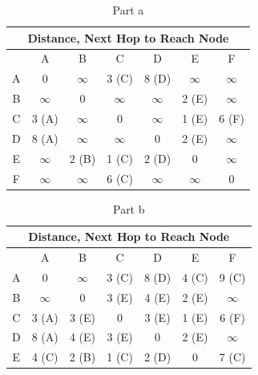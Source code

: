 \documentclass[12pt,addpoints,answers]{exam}
\begin{document}
\begin{questions}
\begin{table}[]
	\centering
	\caption{Part a}
	\label{Solution 7}
	\begin{tabular}{|c|c|c|c|c|c|c|}
		\hline
		\multicolumn{7}{|c|}{Distance, Next Hop to Reach Node}              \\ \hline
		& A        & B        & C        & D        & E        & F        \\ \hline
		A & 0        & $\infty$ & 3 (C)    & 8 (D)    & $\infty$ & $\infty$ \\
		B & $\infty$ & 0        & $\infty$ & $\infty$ & 2 (E)    & $\infty$ \\
		C & 3 (A)    & $\infty$ & 0        & $\infty$ & 1 (E)    & 6 (F)    \\
		D & 8 (A)    & $\infty$ & $\infty$ & 0        & 2 (E)    & $\infty$ \\
		E & $\infty$ & 2 (B)    & 1 (C)    & 2 (D)    & 0        & $\infty$ \\
		F & $\infty$ & $\infty$ & 6 (C)    & $\infty$ & $\infty$ & 0       
	\end{tabular}
\end{table}
\begin{table}[]
	\centering
	\caption{Part b}
	\label{Solution 7}
	\begin{tabular}{|c|c|c|c|c|c|c|}
		\hline
		\multicolumn{7}{|c|}{Distance, Next Hop to Reach Node}        \\ \hline
		& A        & B        & C     & D        & E     & F        \\ \hline
		A & 0        & $\infty$ & 3 (C) & 8 (D)    & 4 (C) & 9 (C)    \\
		B & $\infty$ & 0        & 3 (E) & 4 (E)    & 2 (E) & $\infty$ \\
		C & 3 (A)    & 3 (E)    & 0     & 3 (E)    & 1 (E) & 6 (F)    \\
		D & 8 (A)    & 4 (E)    & 3 (E) & 0        & 2 (E) & $\infty$ \\
		E & 4 (C)    & 2 (B)    & 1 (C) & 2 (D)    & 0     & 7 (C)    \\

\end{tabular}
\end{table}
\end{questions}
\end{document}
